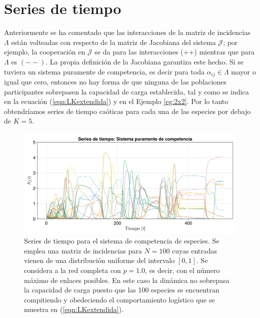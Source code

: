 \section{Series de tiempo}

Anteriormente se ha comentado que las interacciones de la matriz de incidencias $\Lambda$ están volteadas con respecto de la matriz de Jacobiana del sistema $\mathcal{J}$; por ejemplo, la cooperación en $\mathcal{J}$ se da para las interacciones (++) mientras que para $\Lambda$ es $(--)$. La propia definición de la Jacobiana garantiza este hecho. Si se tuviera un sistema puramente de competencia, es decir para toda $\alpha_{ij}\in\Lambda$ mayor o igual que cero, entonces no hay forma de que ninguna de las poblaciones participantes sobrepasen la capacidad de carga establecida, tal y como se indica en la ecuación (\ref{eqn:LKextendida}) y en el Ejemplo \ref{eg:2x2}. Por lo tanto obtendríamos series de tiempo caóticas para cada una de las especies por debajo de $K=5$.
\begin{figure}[h!]
	\centering
	\includegraphics[scale=0.23]{../Imagenes/Seriesdetiempopositiva}
	\caption{Series de tiempo para el sistema de competencia de especies. Se emplea una matriz de incidencias para $N=100$ cuyas entradas vienen de una distribución uniforme del intervalo $[0,1]$. Se considera a la red completa con $p=1.0$, es decir, con el número máximo de enlaces posibles. En este caso la dinámica no sobrepasa la capacidad de carga puesto que las 100 especies se encuentran compitiendo y obedeciendo el comportamiento logístico que se muestra en (\ref{eqn:LKextendida}).}
	\label{fig:Seriesdetiempopostiva}
\end{figure}

